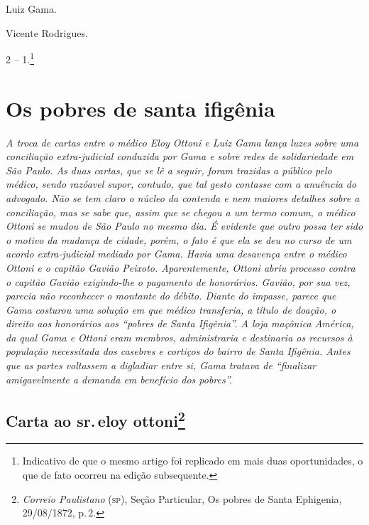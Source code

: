 Luiz Gama.

Vicente Rodrigues.

2 -- 1.\footnote{ Indicativo de que o mesmo artigo foi replicado em
  mais duas oportunidades, o que de fato ocorreu na edição subsequente.}

\part{Os pobres de santa ifigênia}

\begin{argumento}
\emph{A troca de cartas entre o médico Eloy Ottoni e Luiz Gama lança
luzes sobre uma conciliação extra-judicial conduzida por Gama e sobre
redes de solidariedade em São Paulo. As duas cartas, que se lê a seguir,
foram trazidas a público pelo médico, sendo razóavel supor, contudo, que
tal gesto contasse com a anuência do advogado. Não se tem claro o núcleo
da contenda e nem maiores detalhes sobre a conciliação, mas se sabe que,
assim que se chegou a um termo comum, o médico Ottoni se mudou de São
Paulo no mesmo dia. É evidente que outro possa ter sido o motivo da
mudança de cidade, porém, o fato é que ela se deu no curso de um acordo
extra-judicial mediado por Gama. Havia uma desavença entre o médico
Ottoni e o capitão Gavião Peixoto. Aparentemente, Ottoni abriu processo
contra o capitão Gavião exigindo-lhe o pagamento de honorários. Gavião,
por sua vez, parecia não reconhecer o montante do débito. Diante do
impasse, parece que Gama costurou uma solução em que médico transferia,
a título de doação, o direito aos honorários aos ``pobres de Santa
Ifigênia''. A loja maçônica América, da qual Gama e Ottoni eram membros,
administraria e destinaria os recursos à população necessitada dos
casebres e cortiços do bairro de Santa Ifigênia. Antes que as partes
voltassem a digladiar entre si, Gama tratava de ``finalizar amigavelmente
a demanda em benefício dos pobres''.}
\end{argumento}

\chapter{Carta ao sr.\,eloy ottoni\footnote{\emph{Correio Paulistano} (\textsc{sp}), Seção Particular, Os
  pobres de Santa Ephigenia, 29/08/1872, p.\,2.}} %

